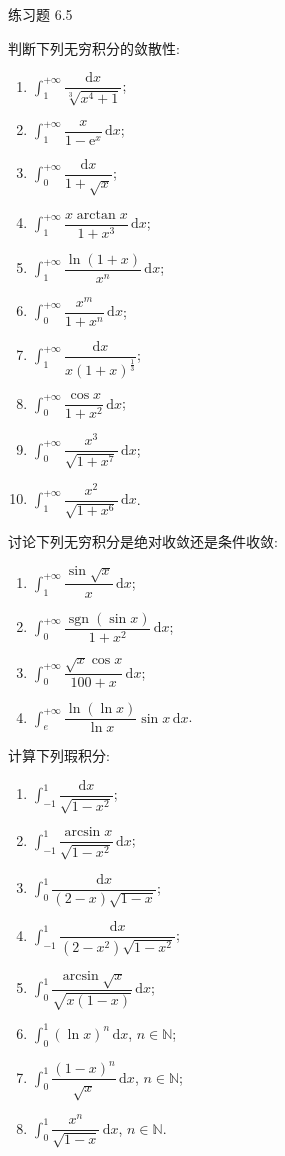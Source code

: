 \begin{exblock}{练习题 6.5}
  \item 判断下列无穷积分的敛散性:
  \begin{enumerate}[label=(\arabic*)]
    \item $\int_{1}^{+\infty}\dfrac{\mathrm{d}x}{\sqrt[3]{x^{4}+1}}$;
    \item $\int_{1}^{+\infty}\dfrac{x}{1-\mathrm{e}^{x}}\,\mathrm{d}x$;
    \item $\int_{0}^{+\infty}\dfrac{\mathrm{d}x}{1+\sqrt{x}}$;
    \item $\int_{1}^{+\infty}\dfrac{x\arctan x}{1+x^{3}}\,\mathrm{d}x$;
    \item $\int_{1}^{+\infty}\dfrac{\ln(1+x)}{x^{n}}\,\mathrm{d}x$;
    \item $\int_{0}^{+\infty}\dfrac{x^{m}}{1+x^{n}}\,\mathrm{d}x$;
    \item $\int_{1}^{+\infty}\dfrac{\mathrm{d}x}{x(1+x)^{\frac{1}{3}}}$;
    \item $\int_{0}^{+\infty}\dfrac{\cos x}{1+x^{2}}\,\mathrm{d}x$;
    \item $\int_{0}^{+\infty}\dfrac{x^{3}}{\sqrt{1+x^{7}}}\,\mathrm{d}x$;
    \item $\int_{1}^{+\infty}\dfrac{x^{2}}{\sqrt{1+x^{6}}}\,\mathrm{d}x$.
  \end{enumerate}

  \item 讨论下列无穷积分是绝对收敛还是条件收敛:
  \begin{enumerate}[label=(\arabic*)]
    \item $\int_{1}^{+\infty}\dfrac{\sin\sqrt{x}}{x}\,\mathrm{d}x$;
    \item $\int_{0}^{+\infty}\dfrac{\operatorname{sgn}(\sin x)}{1+x^{2}}\,\mathrm{d}x$;
    \item $\int_{0}^{+\infty}\dfrac{\sqrt{x}\cos x}{100+x}\,\mathrm{d}x$;
    \item $\int_{e}^{+\infty}\dfrac{\ln(\ln x)}{\ln x}\sin x\,\mathrm{d}x$.
  \end{enumerate}

  \item 计算下列瑕积分:
  \begin{enumerate}[label=(\arabic*)]
    \item $\int_{-1}^{1}\dfrac{\mathrm{d}x}{\sqrt{1-x^{2}}}$;
    \item $\int_{-1}^{1}\dfrac{\arcsin x}{\sqrt{1-x^{2}}}\,\mathrm{d}x$;
    \item $\int_{0}^{1}\dfrac{\mathrm{d}x}{(2-x)\sqrt{1-x}}$;
    \item $\int_{-1}^{1}\dfrac{\mathrm{d}x}{(2-x^{2})\sqrt{1-x^{2}}}$;
    \item $\int_{0}^{1}\dfrac{\arcsin\sqrt{x}}{\sqrt{x(1-x)}}\,\mathrm{d}x$;
    \item $\int_{0}^{1}(\ln x)^{n}\,\mathrm{d}x$, $n\in\mathbb{N}$;
    \item $\int_{0}^{1}\dfrac{(1-x)^{n}}{\sqrt{x}}\,\mathrm{d}x$, $n\in\mathbb{N}$;
    \item $\int_{0}^{1}\dfrac{x^{n}}{\sqrt{1-x}}\,\mathrm{d}x$, $n\in\mathbb{N}$.
  \end{enumerate}


\end{exblock}
